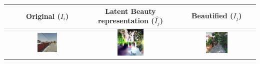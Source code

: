 	\begin{table}\sffamily
    \centering
	\begin{tabular}{l*3{C}@{}}
		\toprule
		 & Original ($I_i$) & Latent Beauty representation ($\hat{I_j}$) & Beautified ($I_j$) \\ 
		\midrule
		& \includegraphics[width=0.3\textwidth]{Plot/examples/u_9} & \includegraphics[width=0.3\textwidth]{Plot/examples/t_9} &  \includegraphics[width=0.3\textwidth]{Plot/examples/b_9} \\ 

\end{tabular}
\end{table}
